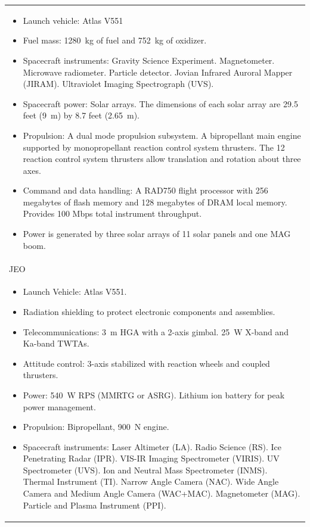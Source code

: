 \begin{longtable}{p{}}
  \begin{itemize}
  \item Launch vehicle: Atlas V551
  \item Fuel mass: \SI{1280}{kg} of fuel and \SI{752}{kg} of oxidizer.
  \item Spacecraft instruments: Gravity Science Experiment.
    Magnetometer. Microwave radiometer. Particle detector. Jovian
    Infrared Auroral Mapper (JIRAM). Ultraviolet Imaging Spectrograph
    (UVS).
  \item Spacecraft power: Solar arrays. The dimensions of each solar array
    are 29.5 feet (\SI{9}{m}) by 8.7 feet (\SI{2.65}{m}).
  \item Propulsion: A dual mode propulsion subsystem. A bipropellant
    main engine supported by monopropellant reaction control system
    thrusters. The 12 reaction control system thrusters allow
    translation and rotation about three axes.
  \item Command and data handling: A RAD750 flight processor with 256
    megabytes of flash memory and 128 megabytes of DRAM local
    memory. Provides 100 Mbps total instrument throughput.
  \item Power is generated by three solar arrays of 11
    solar panels and one MAG boom.
  \end{itemize} \\ \pagebreak

  JEO \\ \midrule
  \begin{itemize}
  \item Launch Vehicle: Atlas V551.
  \item Radiation shielding to protect electronic components and
    assemblies.
  \item Telecommunications: \SI{3}{m} HGA with a 2-axis
    gimbal. \SI{25}{W} X-band and Ka-band TWTAs.
  \item Attitude control: 3-axis stabilized with reaction wheels and
    coupled thrusters.
  \item Power: \SI{540}{W} RPS (MMRTG or ASRG). Lithium ion battery
    for peak power management.
  \item Propulsion: Bipropellant, \SI{900}{N} engine.
  \item Spacecraft instruments: Laser Altimeter (LA). Radio Science
    (RS). Ice Penetrating Radar (IPR). VIS-IR Imaging Spectrometer
    (VIRIS). UV Spectrometer (UVS). Ion and Neutral Mass Spectrometer
    (INMS). Thermal Instrument (TI). Narrow Angle Camera (NAC). Wide
    Angle Camera and Medium Angle Camera (WAC+MAC). Magnetometer
    (MAG). Particle and Plasma Instrument (PPI).
  \end{itemize} \\


\end{longtable}
